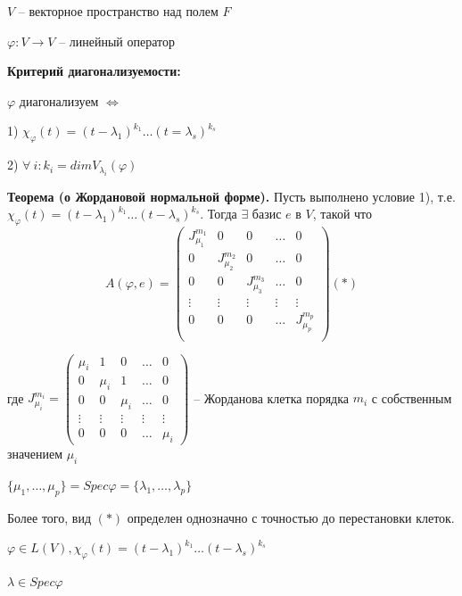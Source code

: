 $V$ -- векторное пространство над полем $F$

$\varphi: V \rightarrow V$ -- линейный оператор

\vspace{\baselineskip}
\textbf{\textbf{Критерий диагонализуемости:}}

$\varphi$ диагонализуем $\Leftrightarrow$

1) $\chi_{\varphi} (t) = (t - \lambda_1)^{k_1} \dots (t = \lambda_s)^{k_s}$

2) $\forall \ i: k_i = dim V_{\lambda_i} (\varphi)$

\vspace{\baselineskip}
\textbf{Теорема (о Жордановой нормальной форме).} Пусть выполнено условие 1), т.е. $\chi_{\varphi} (t) = (t - \lambda_1)^{k_1} \dots (t - \lambda_s)^{k_s}$. Тогда $\exists$ базис $e$ в $V$, такой что \[A(\varphi, e) = \left(
\begin{array}{c|c|c|c|c}
  J^{m_1}_{\mu_1} & 0 & 0 & \dots & 0  \\
  \hline
  0 & J^{m_2}_{\mu_2} & 0 & \dots & 0  \\
  \hline
  0 & 0 & J^{m_3}_{\mu_3} & \dots & 0 \\
  \hline
  \vdots & \vdots & \vdots & \vdots & \vdots \\
  \hline
  0 & 0 & 0 & \dots & J^{m_p}_{\mu_p} \\
\end{array}
\right) (*)\]

где $J^{m_i}_{\mu_i} = \begin{pmatrix} \mu_i & 1 & 0 & \dots & 0 \\ 0 & \mu_i & 1 & \dots & 0 \\ 0 & 0 & \mu_i & \dots & 0
\\ \vdots & \vdots & \vdots & \vdots & \vdots \\ 0 & 0 & 0 & \dots & \mu_i \end{pmatrix}$ -- Жорданова клетка порядка $m_i$ с собственным значением $\mu_i$

$\{\mu_1, \dots, \mu_p\} = Spec \varphi = \{\lambda_1, \dots, \lambda_p\}$

\vspace{\baselineskip}
Более того, вид $(*)$ определен однозначно с точностью до перестановки клеток.

\vspace{\baselineskip}
$\varphi \in L(V), \chi_{\varphi} (t) = (t - \lambda_1)^{k_1} \dots (t - \lambda_s)^{k_s}$

$\lambda \in Spec \varphi$

